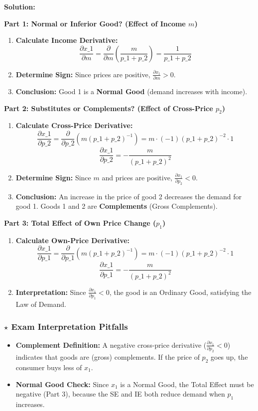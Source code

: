 \documentclass{article}
\begin{document}
\textbf{Solution:}

\textbf{Part 1: Normal or Inferior Good? (Effect of Income $m$)}
\begin{enumerate}
    \item \textbf{Calculate Income Derivative:}
    \[ \frac{\partial x\_1}{\partial m} = \frac{\partial}{\partial m} \left( \frac{m}{p\_1 + p\_2} \right) = \frac{1}{p\_1 + p\_2} \]
    \item \textbf{Determine Sign:} Since prices are positive, $\frac{\partial x_1}{\partial m} > 0$.
    \item \textbf{Conclusion:} Good 1 is a \textbf{Normal Good} (demand increases with income).
\end{enumerate}

\textbf{Part 2: Substitutes or Complements? (Effect of Cross-Price $p_2$)}
\begin{enumerate}
    \item \textbf{Calculate Cross-Price Derivative:}
    \[ \frac{\partial x\_1}{\partial p\_2} = \frac{\partial}{\partial p\_2} \left( m (p\_1 + p\_2)^{-1} \right) = m \cdot (-1) (p\_1 + p\_2)^{-2} \cdot 1 \]
    \[ \frac{\partial x\_1}{\partial p\_2} = -\frac{m}{(p\_1 + p\_2)^2} \]
    \item \textbf{Determine Sign:} Since $m$ and prices are positive, $\frac{\partial x_1}{\partial p_2} < 0$.
    \item \textbf{Conclusion:} An increase in the price of good 2 decreases the demand for good 1. Goods 1 and 2 are \textbf{Complements} (Gross Complements).
\end{enumerate}

\textbf{Part 3: Total Effect of Own Price Change ($p_1$)}
\begin{enumerate}
    \item \textbf{Calculate Own-Price Derivative:}
    \[ \frac{\partial x\_1}{\partial p\_1} = \frac{\partial}{\partial p\_1} \left( m (p\_1 + p\_2)^{-1} \right) = m \cdot (-1) (p\_1 + p\_2)^{-2} \cdot 1 \]
    \[ \frac{\partial x\_1}{\partial p\_1} = -\frac{m}{(p\_1 + p\_2)^2} \]
    \item \textbf{Interpretation:} Since $\frac{\partial x_1}{\partial p_1} < 0$, the good is an Ordinary Good, satisfying the Law of Demand.
\end{enumerate}

\subsubsection*{$\star$ Exam Interpretation Pitfalls}
\begin{itemize}
    \item \textbf{Complement Definition:} A negative cross-price derivative ($\frac{\partial x_1}{\partial p_2} < 0$) indicates that goods are (gross) complements. If the price of $p_2$ goes up, the consumer buys less of $x_1$.
    \item \textbf{Normal Good Check:} Since $x_1$ is a Normal Good, the Total Effect must be negative (Part 3), because the SE and IE both reduce demand when $p_1$ increases.
\end{itemize}
\end{document}

